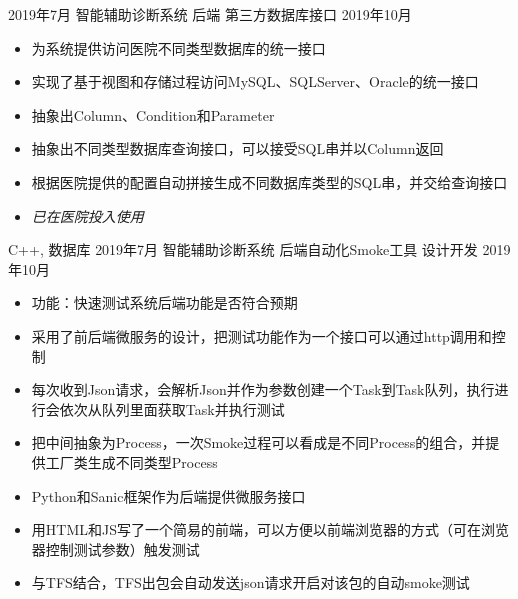 %
%


\begin{experiences}
 \experience
    { 2019年7月 }  { 智能辅助诊断系统 }{ 后端 }{ 第三方数据库接口 }
    { 2019年10月 } {
                      \begin{itemize}
                        \item 为系统提供访问医院不同类型数据库的统一接口
                        \item 实现了基于视图和存储过程访问MySQL、SQLServer、Oracle的统一接口
                        \item 抽象出Column、Condition和Parameter
                        \item 抽象出不同类型数据库查询接口，可以接受SQL串并以Column返回
                        \item 根据医院提供的配置自动拼接生成不同数据库类型的SQL串，并交给查询接口
                        \item \emph{已在医院投入使用}
                      \end{itemize}
                      \vspace{2pt}
                    }
                    {C++, 数据库}
  \experience
    { 2019年7月 }   { 智能辅助诊断系统 }{ 后端自动化Smoke工具 }{ 设计开发 }
    { 2019年10月 }  {
                      \begin{itemize}
                        \item 功能：快速测试系统后端功能是否符合预期
                        \item 采用了前后端微服务的设计，把测试功能作为一个接口可以通过http调用和控制
                        \item 每次收到Json请求，会解析Json并作为参数创建一个Task到Task队列，执行进行会依次从队列里面获取Task并执行测试
                        \item 把中间抽象为Process，一次Smoke过程可以看成是不同Process的组合，并提供工厂类生成不同类型Process
                        \item Python和Sanic框架作为后端提供微服务接口
                        \item 用HTML和JS写了一个简易的前端，可以方便以前端浏览器的方式（可在浏览器控制测试参数）触发测试
                        \item 与TFS结合，TFS出包会自动发送json请求开启对该包的自动smoke测试

\end{itemize}}
\end{experiences}
